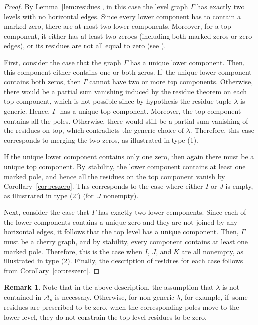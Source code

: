 \documentclass[11pt]{article}
\theoremstyle{definition}
\newtheorem{rmk}[thm]{Remark}
\begin{document}
\begin{proof}
By Lemma~\ref{lem:residues}, in this case the level graph $\Gamma$ has exactly two levels with no horizontal edges. Since every lower component has to contain a marked zero, there are at most two lower components.
Moreover, for a top component, it either has at least two zeroes (including both marked zeros or zero edges), or its residues are not all equal to zero (see \cite[Th.\,1.2(i)]{getaab}).

First, consider the case that the graph $\Gamma$ has a unique lower component. Then, this component either contains one or both zeros. If~the unique lower component contains both zeros, then $\Gamma$ cannot have two or more top components. Otherwise, there would be a partial sum vanishing induced by the residue theorem on each top component, which is not possible since by hypothesis the residue tuple $\lambda$ is generic. Hence, $\Gamma$~has a unique top component. Moreover, the top component contains all the poles. Otherwise, there would still be a partial sum vanishing of the residues on top, which contradicts the generic choice of $\lambda$. Therefore, this case corresponds to merging the two zeros, as illustrated in type (1).

If the unique lower component contains only one zero, then again there must be a unique top component. By~stability, the lower component contains at least one marked pole, and hence all the residues on the top component vanish by Corollary~\ref{cor:reszero}. This corresponds to the case where either $I$ or $J$ is empty, as illustrated in type (2') (for~$J$ nonempty).

Next, consider the case that $\Gamma$ has exactly two lower components. Since each of the lower components contains a unique zero and they are not joined by any horizontal edges, it follows that the top level has a unique component.
Then, $\Gamma$ must be a cherry graph, and by stability, every component contains at least one marked pole. Therefore, this is the case when $I$, $J$, and $K$ are all nonempty, as illustrated in type (2).
Finally, the description of residues for each case follows from Corollary~\ref{cor:reszero}.
\end{proof}

\begin{rmk}
Note that in the above description, the assumption that $\lambda$ is not contained in $\mathcal{A}_{p}$ is necessary. Otherwise, for non-generic $\lambda$, for example, if~some residues are prescribed to be zero, when the corresponding poles move to the lower level, they do not constrain the top-level residues to be zero.
\end{rmk}
\end{document}
